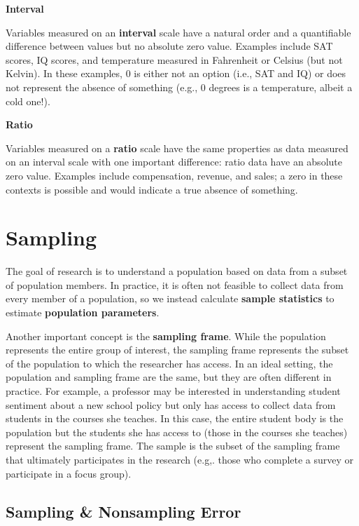 \documentclass[]{book}
\begin{document}
\textbf{Interval}

Variables measured on an \textbf{interval} scale have a natural order and a quantifiable difference between values but no absolute zero value. Examples include SAT scores, IQ scores, and temperature measured in Fahrenheit or Celsius (but not Kelvin). In these examples, 0 is either not an option (i.e., SAT and IQ) or does not represent the absence of something (e.g., 0 degrees is a temperature, albeit a cold one!).

\textbf{Ratio}

Variables measured on a \textbf{ratio} scale have the same properties as data measured on an interval scale with one important difference: ratio data have an absolute zero value. Examples include compensation, revenue, and sales; a zero in these contexts is possible and would indicate a true absence of something.

\hypertarget{sampling}{%
\section{Sampling}\label{sampling}}

The goal of research is to understand a population based on data from a subset of population members. In practice, it is often not feasible to collect data from every member of a population, so we instead calculate \textbf{sample statistics} to estimate \textbf{population parameters}.

Another important concept is the \textbf{sampling frame}. While the population represents the entire group of interest, the sampling frame represents the subset of the population to which the researcher has access. In an ideal setting, the population and sampling frame are the same, but they are often different in practice. For example, a professor may be interested in understanding student sentiment about a new school policy but only has access to collect data from students in the courses she teaches. In this case, the entire student body is the population but the students she has access to (those in the courses she teaches) represent the sampling frame. The sample is the subset of the sampling frame that ultimately participates in the research (e.g,. those who complete a survey or participate in a focus group).

\hypertarget{sampling-nonsampling-error}{%
\subsection{Sampling \& Nonsampling Error}\label{sampling-nonsampling-error}}
\end{document}
